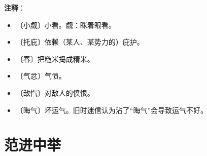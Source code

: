 \documentclass[12pt,UTF-8,openany]{ctexbook}
\begin{document}
\newpage

\textbf{注释}：

\vspace{-1em}

\begin{itemize}
    \setlength\itemsep{-0.2em}
    \item 〔小觑〕小看。觑：眯着眼看。
    \item 〔托庇〕依赖（某人、某势力的）庇护。
    \item 〔舂〕把糙米捣成精米。
    \item 〔气忿〕气愤。
    \item 〔敌忾〕对敌人的愤恨。
    \item 〔晦气〕坏运气。旧时迷信认为沾了“晦气”会导致运气不好。
\end{itemize}

\chapter{范进中举}
\end{document}
